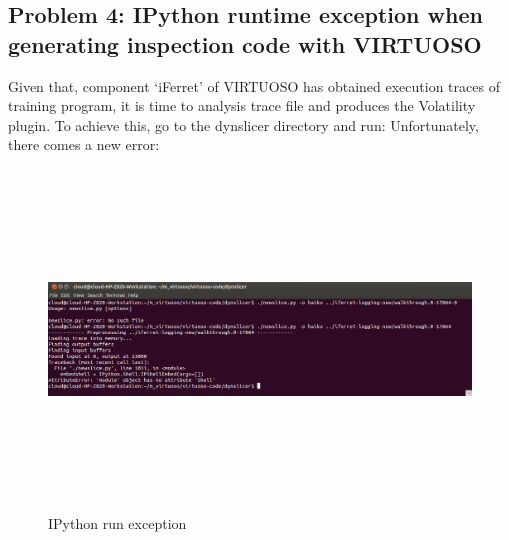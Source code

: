 \subsection{Problem 4: IPython runtime exception when generating inspection code with VIRTUOSO}
Given that, component ‘iFerret’ of VIRTUOSO has obtained execution traces of training program, it is time to analysis trace file and 
produces the Volatility plugin. To achieve this, go to the dynslicer directory and run:
Unfortunately, there comes a new error:

\begin{figure}[htbp]
	\centering
		\includegraphics[width=14cm, height= 9cm ]{Figures/Figure37.png}
	\caption[IPython run exception]{IPython run exception}
	\label{fig:IPython run exception}
\end{figure}

